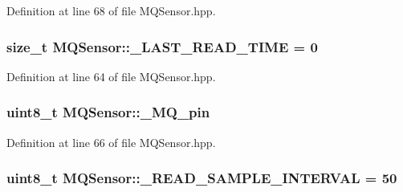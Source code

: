 Definition at line 68 of file M\+Q\+Sensor.\+hpp.

\subsubsection[{\texorpdfstring{\+\_\+\+L\+A\+S\+T\+\_\+\+R\+E\+A\+D\+\_\+\+T\+I\+ME}{_LAST_READ_TIME}}]{\setlength{\rightskip}{0pt plus 5cm}size\+\_\+t M\+Q\+Sensor\+::\+\_\+\+L\+A\+S\+T\+\_\+\+R\+E\+A\+D\+\_\+\+T\+I\+ME = 0\hspace{0.3cm}{\ttfamily [protected]}}\hypertarget{class_m_q_sensor_a464b0db94d80b771efca70a0eb58f951}{}\label{class_m_q_sensor_a464b0db94d80b771efca70a0eb58f951}


Definition at line 64 of file M\+Q\+Sensor.\+hpp.

\subsubsection[{\texorpdfstring{\+\_\+\+M\+Q\+\_\+pin}{_MQ_pin}}]{\setlength{\rightskip}{0pt plus 5cm}uint8\+\_\+t M\+Q\+Sensor\+::\+\_\+\+M\+Q\+\_\+pin\hspace{0.3cm}{\ttfamily [protected]}}\hypertarget{class_m_q_sensor_aaa75c5a8dbb6b8bfba63a7b8749acd82}{}\label{class_m_q_sensor_aaa75c5a8dbb6b8bfba63a7b8749acd82}


Definition at line 66 of file M\+Q\+Sensor.\+hpp.

\subsubsection[{\texorpdfstring{\+\_\+\+R\+E\+A\+D\+\_\+\+S\+A\+M\+P\+L\+E\+\_\+\+I\+N\+T\+E\+R\+V\+AL}{_READ_SAMPLE_INTERVAL}}]{\setlength{\rightskip}{0pt plus 5cm}uint8\+\_\+t M\+Q\+Sensor\+::\+\_\+\+R\+E\+A\+D\+\_\+\+S\+A\+M\+P\+L\+E\+\_\+\+I\+N\+T\+E\+R\+V\+AL = 50\hspace{0.3cm}{\ttfamily [protected]}}\hypertarget{class_m_q_sensor_a7dcb6e9f9ff88b498d7b47dd33b0809f}{}\label{class_m_q_sensor_a7dcb6e9f9ff88b498d7b47dd33b0809f}


